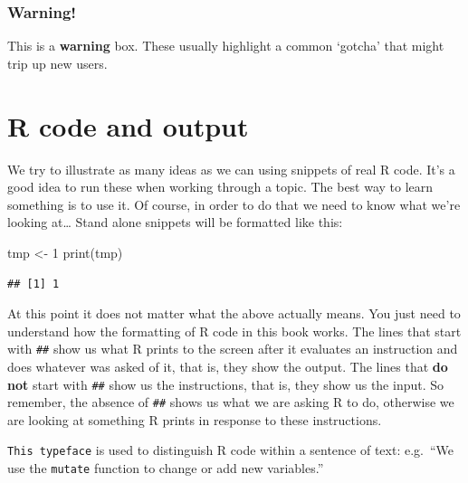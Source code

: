 \documentclass[
]{book}
\newenvironment{Shaded}{\begin{snugshade}}{\end{snugshade}}
\newcommand{\DecValTok}[1]{\textcolor[rgb]{0.00,0.00,0.81}{#1}}
\newcommand{\FunctionTok}[1]{\textcolor[rgb]{0.00,0.00,0.00}{#1}}
\newcommand{\NormalTok}[1]{#1}
\newcommand{\OtherTok}[1]{\textcolor[rgb]{0.56,0.35,0.01}{#1}}
\newenvironment{greybox}{
  \definecolor{shadecolor}{rgb}{0.95,0.95,0.95}  %
  \color{black}
  \begin{shaded}}
 {\end{shaded}}
\newenvironment{infobox}[1]
  {
  \begin{itemize}
  \renewcommand{\labelitemi}{
    \raisebox{-.7\height}[0pt][0pt]{
      {\setkeys{Gin}{width=3em,keepaspectratio}
        \texttt{[image: images/\#1]}}
    }
  }
  \setlength{\fboxsep}{1em}
  \begin{greybox}
  \item
  }
  {
  \end{greybox}
  \end{itemize}
  }
\begin{document}
\begin{infobox}{warning}

\hypertarget{warning}{%
\subsubsection*{Warning!}\label{warning}}

This is a \textbf{warning} box. These usually highlight a common `gotcha' that might trip up new users.

\end{infobox}

\hypertarget{r-code-and-output}{%
\section*{R code and output}\label{r-code-and-output}}

We try to illustrate as many ideas as we can using snippets of real R code. It's a good idea to run these when working through a topic. The best way to learn something is to use it. Of course, in order to do that we need to know what we're looking at\ldots{} Stand alone snippets will be formatted like this:

\begin{Shaded}
\begin{Highlighting}[]
\NormalTok{tmp }\OtherTok{\textless{}{-}} \DecValTok{1}
\FunctionTok{print}\NormalTok{(tmp)}
\end{Highlighting}
\end{Shaded}

\begin{verbatim}
## [1] 1
\end{verbatim}

At this point it does not matter what the above actually means. You just need to understand how the formatting of R code in this book works. The lines that start with \texttt{\#\#} show us what R prints to the screen after it evaluates an instruction and does whatever was asked of it, that is, they show the output. The lines that \textbf{do not} start with \texttt{\#\#} show us the instructions, that is, they show us the input. So remember, the absence of \texttt{\#\#} shows us what we are asking R to do, otherwise we are looking at something R prints in response to these instructions.

\texttt{This\ typeface} is used to distinguish R code within a sentence of text: e.g.~``We use the \texttt{mutate} function to change or add new variables.''
\end{document}
